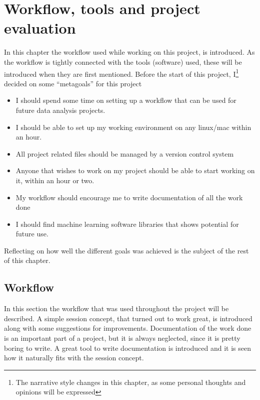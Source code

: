 \chapter{Workflow, tools and project evaluation}\label{chp:tools}
In this chapter the workflow used while working on this project, is introduced. As the workflow is tightly connected with the tools (software) used, these will be introduced when they are first mentioned. Before the start of this project, I\footnote{The narrative style changes in this chapter, as some personal thoughts and opinions will be expressed} decided on some ``metagoals'' for this project
\begin{itemize}
    \item I should spend some time on setting up a workflow that can be used for future data analysis projects.
    \item I should be able to set up my working environment on any linux/mac within an hour.
    \item All project related files should be managed by a version control system
    \item Anyone that wishes to work on my project should be able to start working on it, within an hour or two.
    \item My workflow should encourage me to write documentation of all the work done
    \item I should find machine learning software libraries that shows potential for future use.
\end{itemize}
Reflecting on how well the different goals was achieved is the subject of the rest of this chapter.


\section{Workflow}
In this section the workflow that was used throughout the project will be described. A simple session concept, that turned out to work great, is introduced along with some suggestions for improvements. Documentation of the work done is an important part of a project, but it is always neglected, since it is pretty boring to write. A great tool to write documentation is introduced and it is seen how it naturally fits with the session concept.

